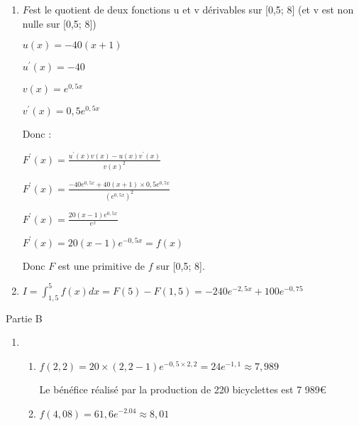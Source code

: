 \begin{corrige}
\begin{enumerate}
\begin{center}
\end{center}
          \item
          $F $est le quotient de deux fonctions u et v dérivables sur [0,5; 8] (et v est non nulle sur [0,5; 8])
          \par
          $u\left(x\right)=-40\left(x+1\right)$
          \par
          $u^{\prime}\left(x\right)=-40$
          \par
          $v\left(x\right)=e^{0,5x}$
          \par
          $v^{\prime}\left(x\right)=0,5e^{0,5x}$
          \par
          Donc :
          \par
          $F^{\prime}\left(x\right)=\frac{u^{\prime}\left(x\right)v\left(x\right)-u\left(x\right)v^{\prime}\left(x\right)}{v\left(x\right)^{2}}$
          \par
          $F^{\prime}\left(x\right) = \frac{-40e^{0,5x}+40\left(x+1\right)\times 0,5e^{0,5x}}{\left(e^{0,5x}\right)^{2}}$
          \par
          $F^{\prime}\left(x\right) = \frac{20\left(x-1\right)e^{0,5x}}{e^{x}}$
          \par
          $F^{\prime}\left(x\right) = 20\left(x-1\right)e^{-0,5x}=f\left(x\right)$
          \par
          Donc $F$ est une primitive de $f$ sur [0,5; 8].
          \item
          $I=\int_{1,5}^{5}f\left(x\right)dx=F\left(5\right)-F\left(1,5\right)=-240e^{-2,5x}+100e^{-0,75}$
     \end{enumerate}
     \begin{h3}Partie B\end{h3}
     \begin{enumerate}
          \item
          \begin{enumerate}
               \item
               $f\left(2,2\right)=20\times \left(2,2-1\right)e^{-0,5\times 2,2}=24e^{-1,1}\approx 7,989$
               \par
               Le bénéfice réalisé par la production de 220 bicyclettes est 7 989€
               \item
               $f\left(4,08\right)=61,6e^{-2.04}\approx 8,01$
               \par

\end{enumerate}
\end{enumerate}
\end{corrige}
